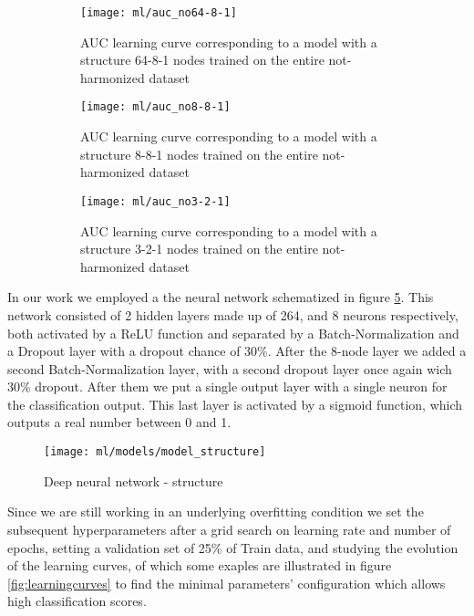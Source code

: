 \documentclass[a4paper,11pt]{article}
\begin{document}
\begin{figure}
\centering
\begin{subfigure}[b]{0.3\textwidth}
   \texttt{[image: ml/auc\_no64-8-1]}
   \caption{AUC learning curve corresponding to a model with a structure 64-8-1 nodes trained on the entire not-harmonized dataset}
   \label{fig:auc_no64-8-1}
\end{subfigure}
\begin{subfigure}[b]{0.3\textwidth}
   \texttt{[image: ml/auc\_no8-8-1]}
   \caption{AUC learning curve corresponding to a model with a structure 8-8-1 nodes trained on the entire not-harmonized dataset}
   \label{fig:auc_no8-8-1}
\end{subfigure}
\begin{subfigure}[b]{0.3\textwidth}
   \texttt{[image: ml/auc\_no3-2-1]}
   \caption{AUC learning curve corresponding to a model with a structure 3-2-1 nodes trained on the entire not-harmonized dataset}
   \label{fig:auc_no3-2-1}
\end{subfigure}
\caption{}
\label{fig:learningcurve}
\end{figure}


In our work we employed a the neural network schematized in figure \ref{fig:model_structure}.
This network consisted of 2 hidden layers made up of 264, and 8 neurons respectively, both activated by a ReLU function and separated by a Batch-Normalization and a Dropout layer with a dropout chance of 30\%.
After the 8-node layer we added a second Batch-Normalization layer, with a second dropout layer once again wich 30\% dropout.
After them we put a single output layer with a single neuron for the classification output.
This last layer is activated by a sigmoid function, which outputs a real number between 0 and 1.



\begin{figure}[h!]
\centering
\texttt{[image: ml/models/model\_structure]}
\caption{Deep neural network - structure}
\label{fig:model_structure}
\end{figure}


Since we are still working in an underlying overfitting condition we set the subsequent hyperparameters after a grid search on learning rate and number of epochs, setting a validation set of 25\% of Train data, and studying the evolution of the learning curves, of which some exaples are illustrated in figure \ref{fig:learningcurves} to find the minimal parameters' configuration which allows high classification scores.
\end{document}
